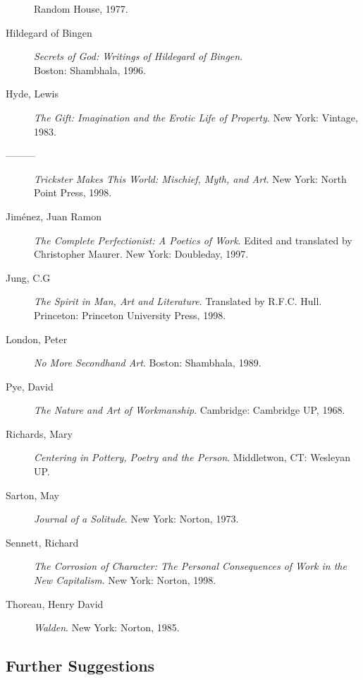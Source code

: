 \documentclass{report}
\begin{document}
\begin{description}
  Random House, 1977.
\item [Hildegard of Bingen] \textit{Secrets of God: Writings of
    Hildegard of Bingen}.\\ Boston: Shambhala, 1996.
\item [Hyde, Lewis] \textit{The Gift: Imagination and the Erotic Life
    of Property}. New York: Vintage, 1983.
\item [---------] \textit{Trickster Makes This World: Mischief, Myth,
    and Art}. New York: North Point Press, 1998.
\item [Jim\'enez, Juan Ramon] \textit{The Complete Perfectionist: A
    Poetics of Work}. Edited and translated by Christopher Maurer. New
  York: Doubleday, 1997.
\item [Jung, C.G] \textit{The Spirit in Man, Art and Literature}.
  Translated by R.F.C. Hull. Princeton: Princeton University Press,
  1998.
\item [London, Peter] \textit{No More Secondhand Art}. Boston:
  Shambhala, 1989.
\item [Pye, David] \textit{The Nature and Art of Workmanship}.
  Cambridge: Cambridge UP, 1968.
\item [Richards, Mary] \textit{Centering in Pottery, Poetry and the
    Person}. Middletwon, CT: Wesleyan UP.
\item [Sarton, May] \textit{Journal of a Solitude}. New York: Norton,
  1973.
\item [Sennett, Richard] \textit{The Corrosion of Character: The
    Personal Consequences of Work in the New Capitalism}. New York:
  Norton, 1998.
\item [Thoreau, Henry David] \textit{Walden}. New York: Norton, 1985.
\end{description}
\newpage

\subsection{Further Suggestions}
\end{document}
